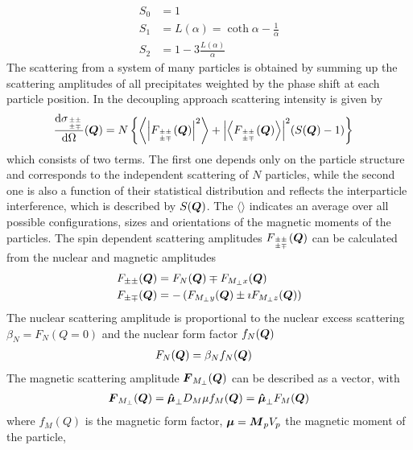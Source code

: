 \begin{subequations}
\label{eq:S_l_Boltzmann}
\begin{align}
S_0 & = 1 \\
S_1 & = L(\alpha) = \coth\alpha - \frac{1}{\alpha} \\
S_2 & = 1-3\frac{L(\alpha)}{\alpha}
\end{align}
\end{subequations}
The scattering from a system of many particles is obtained
by summing up the scattering amplitudes of all precipitates
weighted by the phase shift at each particle position.
In the decoupling approach scattering intensity is given by
\begin{align} \label{eq:I_ijSQ}
\frac{\mathrm{d}\sigma_{{\pm\pm}\atop{\pm\mp}}}{\mathrm{d}\Omega}(\BM{Q}) &=
N\left\{
\left\langle \abs{F_{{\pm\pm}\atop{\pm\mp}}(\BM{Q})}^2\right\rangle
+ \abs{\left\langle F_{{\pm\pm}\atop{\pm\mp}}(\BM{Q})\right\rangle}^2 (S(\BM{Q})-1)
\right\}
\end{align}
which consists of two terms. The first one depends only
on the particle structure and corresponds to the independent
scattering of $N$ particles, while the second one is also a
function of their statistical distribution and reflects the interparticle
interference, which is described by $S(\BM{Q})$. The $\langle\rangle$ indicates
an average over all possible configurations, sizes and orientations of the
magnetic moments of the particles. The spin dependent scattering amplitudes
$F_{{\pm\pm}\atop{\pm\mp}}(\BM{Q})$ can be calculated from the nuclear and magnetic
amplitudes
\begin{align}
F_{\pm\pm}(\BM{Q}) & = F_N(\BM{Q}) \mp F_{M_\perp x}(\BM{Q}) \\
F_{\pm\mp}(\BM{Q}) & = -\left(F_{M_\perp y}(\BM{Q}) \pm \imath F_{M_\perp z}(\BM{Q})\right)
\end{align}
The nuclear scattering amplitude is proportional to the nuclear excess scattering $\beta_N=F_N(Q=0)$
and the nuclear form factor $f_N(\BM{Q})$
\begin{align}
F_N(\BM{Q}) &= \beta_N f_N(\BM{Q})
\end{align}
The magnetic scattering amplitude $\BM{F}_{M_\perp}(\BM{Q})$ can be described as a vector,
with
\begin{align}
\BM{F}_{M_\perp}(\BM{Q}) =  \BM{\hat{\mu}}_\perp D_M \mu f_M(\BM{Q})=\BM{\hat{\mu}}_\perp F_M(\BM{Q})
\end{align}
where $f_M(Q)$ is the magnetic form factor, $\BM{\mu}=\BM{M}_pV_p$ the magnetic moment of the particle,
